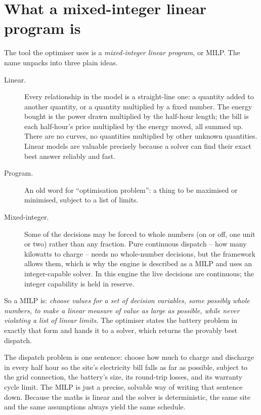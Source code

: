 \section{What a mixed-integer linear program is}

The tool the optimiser uses is a \emph{mixed-integer linear program}, or MILP. The name unpacks into three plain ideas.

\begin{description}
  \item[Linear.] Every relationship in the model is a straight-line one: a quantity added to another quantity, or a quantity multiplied by a fixed number. The energy bought is the power drawn multiplied by the half-hour length; the bill is each half-hour's price multiplied by the energy moved, all summed up. There are no curves, no quantities multiplied by other unknown quantities. Linear models are valuable precisely because a solver can find their exact best answer reliably and fast.
  \item[Program.] An old word for ``optimisation problem'': a thing to be maximised or minimised, subject to a list of limits.
  \item[Mixed-integer.] Some of the decisions may be forced to whole numbers (on or off, one unit or two) rather than any fraction. Pure continuous dispatch -- how many kilowatts to charge -- needs no whole-number decisions, but the framework allows them, which is why the engine is described as a MILP and uses an integer-capable solver. In this engine the live decisions are continuous; the integer capability is held in reserve.
\end{description}

So a MILP is: \emph{choose values for a set of decision variables, some possibly whole numbers, to make a linear measure of value as large as possible, while never violating a list of linear limits.} The optimiser states the battery problem in exactly that form and hands it to a solver, which returns the provably best dispatch.

\begin{keyidea}
The dispatch problem is one sentence: choose how much to charge and discharge in every half hour so the site's electricity bill falls as far as possible, subject to the grid connection, the battery's size, its round-trip losses, and its warranty cycle limit. The MILP is just a precise, solvable way of writing that sentence down. Because the maths is linear and the solver is deterministic, the same site and the same assumptions always yield the same schedule.
\end{keyidea}

